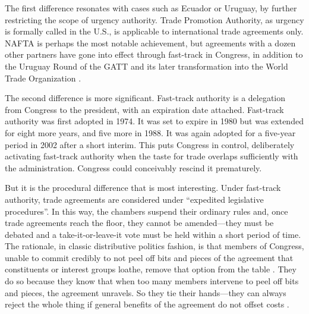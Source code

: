 \documentclass[letter,12pt]{article}
\begin{document}
The first difference resonates with cases such as Ecuador or Uruguay, by further restricting the scope of urgency authority. Trade Promotion Authority, as urgency is formally called in the U.S., is applicable to international trade agreements only. NAFTA is perhaps the most notable achievement, but agreements with a dozen other partners have gone into effect through fast-track in Congress, in addition to the Uruguay Round of the GATT and its later transformation into the World Trade Organization \citep{crs-2015-tpa}. 

The second difference is more significant. Fast-track authority is a delegation from Congress to the president, with an expiration date attached. Fast-track authority was first adopted in 1974. It was set to expire in 1980 but was extended for eight more years, and five more in 1988. It was again adopted for a five-year period in 2002 after a short interim. This puts Congress in control, deliberately activating fast-track authority when the taste for trade overlaps sufficiently with the administration. Congress could conceivably rescind it prematurely.

But it is the procedural difference that is most interesting. Under fast-track authority, trade agreements are considered under ``expedited legislative procedures''. In this way, the chambers suspend their ordinary rules and, once trade agreements reach the floor, they cannot be amended---they must be debated and a take-it-or-leave-it vote must be held within a short period of time. The rationale, in classic distributive politics fashion, is that members of Congress, unable to commit credibly to not peel off bits and pieces of the agreement that constituents or interest groups loathe, remove that option from the table \citep{mcnollgast.1987}. They do so because they know that when too many members intervene to peel off bits and pieces, the agreement unravels. So they tie their hands---they can always reject the whole thing if general benefits of the agreement do not offset costs \citep{destler-1992,destler-1991,margolis-1986,haggard-1988,goldstein-1988,lohmann-ohalloran.1994}.
\end{document}
